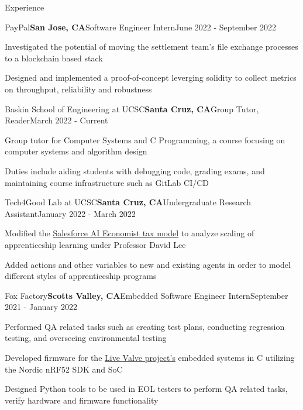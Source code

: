 \documentclass{resume}
\begin{document}
\begin{rSection}{\large Experience}

\begin{rSubsection}{PayPal}{\bf{San Jose, CA}}{Software Engineer Intern}{June 2022 - September 2022}
\item Investigated the potential of moving the settlement team's file exchange processes to a blockchain based stack
\item Designed and implemented a proof-of-concept leverging solidity to collect metrics on throughput, reliability and robustness
\end{rSubsection}

\begin{rSubsection}{Baskin School of Engineering at UCSC}{\bf{Santa Cruz, CA}}{Group Tutor, Reader}{March 2022 - Current}
\item Group tutor for Computer Systems and C Programming, a course focusing on computer systems and algorithm design
\item Duties include aiding students with debugging code, grading exams, and maintaining course infrastructure such as GitLab CI/CD
\end{rSubsection}

\begin{rSubsection}{Tech4Good Lab at UCSC}{\bf{Santa Cruz, CA}}{Undergraduate Research Assistant}{January 2022 - March 2022}
\item Modified the \href{https://github.com/salesforce/ai-economist}{Salesforce AI Economist tax model} to analyze scaling of apprenticeship learning under Professor David Lee
\item Added actions and other variables to new and existing agents in order to model different styles of apprenticeship programs
\end{rSubsection}

\begin{rSubsection}{Fox Factory}{\bf{Scotts Valley, CA}}{Embedded Software Engineer Intern}{September 2021 - January 2022}
\item Performed QA related tasks such as creating test plans, conducting regression testing, and overseeing environmental testing
\item Developed firmware for the \href{https://www.pinkbike.com/news/fox-updates-live-valve-electonic-suspension-for-2022.html}{Live Valve project's} embedded systems in C utilizing the Nordic nRF52 SDK and SoC
\item Designed Python tools to be used in EOL testers to perform QA related tasks, verify hardware and firmware functionality
\end{rSubsection}
\end{rSection}
\end{document}
